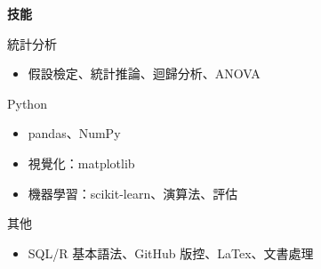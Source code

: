 \documentclass[12pt,aspectratio=169]{beamer}
\begin{document}
\begin{frame}{\textbf{技能}}
  \begin{block}{統計分析}
    \begin{itemize}
      \item 假設檢定、統計推論、迴歸分析、ANOVA
    \end{itemize}
  \end{block}

  \begin{block}{Python}
    \begin{itemize}
      \item pandas、NumPy
      \item 視覺化：matplotlib
      \item 機器學習：scikit-learn、演算法、評估
    \end{itemize}
  \end{block}


  \begin{block}{其他}
    \begin{itemize}
      \item SQL/R 基本語法、GitHub 版控、LaTex、文書處理
    \end{itemize}
  \end{block}
\end{frame}
\end{document}
